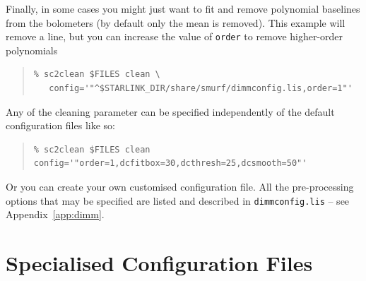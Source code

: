 \documentclass[twoside,11pt]{article}
\newcommand{\htmlref}[2]{#1}
\newcommand{\latexhtml}[2]{#1}
\newcommand{\xlabel}[1]{}
\renewcommand{\_}{\texttt{\symbol{95}}}
\newenvironment{myquote}{\begin{quote}\begin{small}}{\end{small}\end{quote}}
\newcommand{\cref}[3]{\latexhtml{#1~\ref{#2}}{\htmlref{#3}{#2}}}
\begin{document}
Finally, in some cases you might just want to fit and remove
polynomial baselines from the bolometers (by default only the mean is
removed). This example will remove a line, but you can increase the
value of \texttt{order} to remove higher-order polynomials

\begin{myquote}
\begin{verbatim}
% sc2clean $FILES clean \
   config='"^$STARLINK_DIR/share/smurf/dimmconfig.lis,order=1"'
\end{verbatim}
\end{myquote}

Any of the cleaning parameter can be specified independently of the
default configuration files like so:
\begin{myquote}
\begin{verbatim}
% sc2clean $FILES clean config='"order=1,dcfitbox=30,dcthresh=25,dcsmooth=50"'
\end{verbatim}
\end{myquote}
Or you can create your own customised configuration file. All the
pre-processing options that may be specified are listed and described
in \texttt{dimmconfig.lis} -- see \cref{Appendix}{app:dimm}{here}.


\section{\xlabel{special}Specialised Configuration Files}
\label{app:special}
\end{document}
